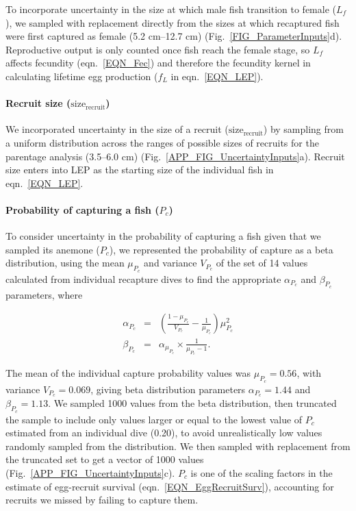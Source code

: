 \documentclass[12pt, oneside]{article}   	%
\begin{document}
To incorporate uncertainty in the size at which male fish transition to female ($L_f$), we sampled with replacement directly from the sizes at which recaptured fish were first captured as female (5.2 cm--12.7 cm) (Fig.\ \ref{FIG_ParameterInputs}d). Reproductive output is only counted once fish reach the female stage, so $L_f$ affects fecundity (eqn.\ \ref{EQN_Fec}) and therefore the fecundity kernel in calculating lifetime egg production ($f_L$ in eqn.\ \ref{EQN_LEP}).

\paragraph*{Recruit size ($\text{size}_\text{recruit}$)} %

We incorporated uncertainty in the size of a recruit ($\text{size}_\text{recruit}$) by sampling from a uniform distribution across the ranges of possible sizes of recruits for the parentage analysis (3.5--6.0 cm) (Fig.\ \ref{APP_FIG_UncertaintyInputs}a). Recruit size enters into LEP as the starting size of the individual fish in eqn.\ \ref{EQN_LEP}.

\paragraph*{Probability of capturing a fish ($P_c$)} %

To consider uncertainty in the probability of capturing a fish given that we sampled its anemone ($P_c$), we represented the probability of capture as a beta distribution, using the mean $\mu_{P_c}$ and variance $V_{P_c}$ of the set of 14 values calculated from individual recapture dives to find the appropriate $\alpha_{P_c}$ and $\beta_{P_c}$ parameters, where 

\begin{eqnarray}
\alpha_{P_c} &=& (\frac{1-\mu_{P_c}}{V_{P_c}} - \frac{1}{\mu_{P_c}}) \mu_{P_c}^2 \\
\beta_{P_c} &=& \alpha_{\mu_{P_c}} \times \frac{1}{\mu_{P_c} - 1}. \label{APP_EQN_ProbCapBetaDistParams}  %
\end{eqnarray}

The mean of the individual capture probability values was $\mu_{P_c} = 0.56$, with variance $V_{P_c} = 0.069$, giving beta distribution parameters $\alpha_{P_c} = 1.44$ and $\beta_{P_c} = 1.13$. We sampled 1000 values from the beta distribution, then truncated the sample to include only values larger or equal to the lowest value of $P_c$ estimated from an individual dive (0.20), to avoid unrealistically low values randomly sampled from the distribution. We then sampled with replacement from the truncated set to get a vector of 1000 values (Fig.\ \ref{APP_FIG_UncertaintyInputs}c). $P_c$ is one of the scaling factors in the estimate of egg-recruit survival (eqn.\ \ref{EQN_EggRecruitSurv}), accounting for recruits we missed by failing to capture them.
\end{document}
